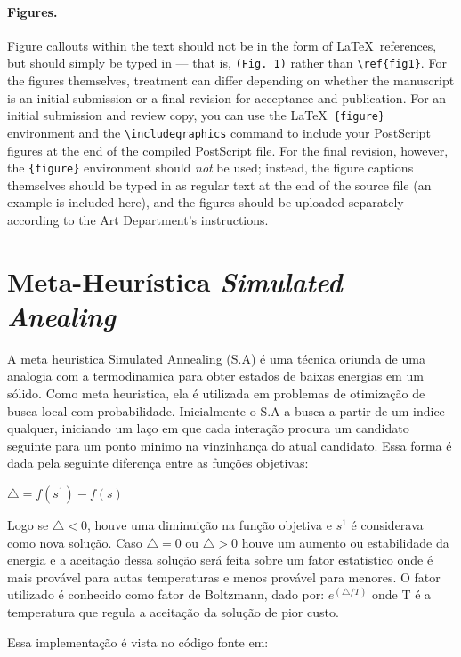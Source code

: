 \documentclass[12pt]{article}
\begin{document}
\paragraph*{Figures.}  Figure callouts within the text should not be
in the form of \LaTeX\ references, but should simply be typed in ---
that is, \verb+(Fig. 1)+ rather than \verb+\ref{fig1}+.  For the
figures themselves, treatment can differ depending on whether the
manuscript is an initial submission or a final revision for acceptance
and publication.  For an initial submission and review copy, you can
use the \LaTeX\ \verb+{figure}+ environment and the
\verb+\includegraphics+ command to include your PostScript figures at
the end of the compiled PostScript file.  For the final revision,
however, the \verb+{figure}+ environment should {\it not\/} be used;
instead, the figure captions themselves should be typed in as regular
text at the end of the source file (an example is included here), and
the figures should be uploaded separately according to the Art
Department's instructions.


\section*{Meta-Heurística \textit{Simulated Anealing}}

A meta heuristica Simulated Annealing (S.A) é uma técnica oriunda de uma analogia com a termodinamica para obter estados de baixas energias em um sólido. Como meta heuristica, ela é utilizada em problemas de otimização de busca local com probabilidade. 
Inicialmente o S.A a busca a partir de um indice qualquer, iniciando um laço em que cada interação procura um candidato seguinte para um ponto minimo na vinzinhança do atual candidato. Essa forma é dada pela seguinte diferença entre as funções objetivas:

$ {\triangle = f (s^1) - f(s) }$

Logo se $ {\triangle < 0 }$, houve uma diminuição na função objetiva e $ s^1$ é considerava como nova solução. Caso $ {\triangle = 0 }$ ou $ {\triangle > 0 }$ houve um aumento ou estabilidade da energia e a aceitação dessa solução será feita sobre um fator estatistico onde é mais provável para autas temperaturas e menos provável para menores. O fator utilizado é conhecido como fator de Boltzmann, dado por: $ {e^{(\triangle / T)} }$ onde T é a temperatura que regula a aceitação da solução de pior custo.

Essa implementação é vista no código fonte em:
\end{document}
